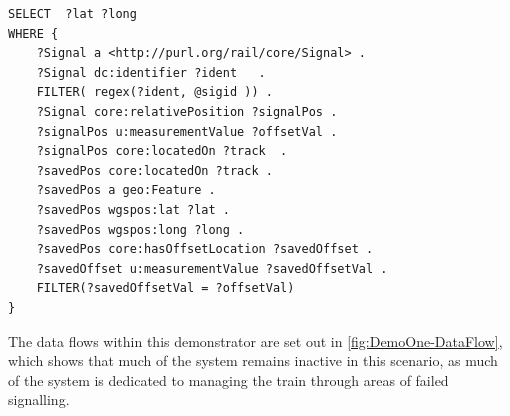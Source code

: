 \begin{lstlisting}[float=h,language=sparql,frame=tb,caption={SPARQL to select a signal location from its identifier. Note some of the features here are Stardog specific, in particular the passing in of the @sigid parameter},label={lst:selectsignallocation}]
SELECT  ?lat ?long
WHERE {
    ?Signal a <http://purl.org/rail/core/Signal> .
    ?Signal dc:identifier ?ident   .
    FILTER( regex(?ident, @sigid )) .
    ?Signal core:relativePosition ?signalPos .
    ?signalPos u:measurementValue ?offsetVal .
    ?signalPos core:locatedOn ?track  .
    ?savedPos core:locatedOn ?track .
    ?savedPos a geo:Feature .
    ?savedPos wgspos:lat ?lat .
    ?savedPos wgspos:long ?long .   
    ?savedPos core:hasOffsetLocation ?savedOffset .
    ?savedOffset u:measurementValue ?savedOffsetVal .  
    FILTER(?savedOffsetVal = ?offsetVal)
}
\end{lstlisting}

\pagebreak

The data flows within this demonstrator are set out in \autoref{fig:DemoOne-DataFlow}, which shows that much of the system remains inactive in this scenario, as much of the system is dedicated to managing the train through areas of failed signalling.

